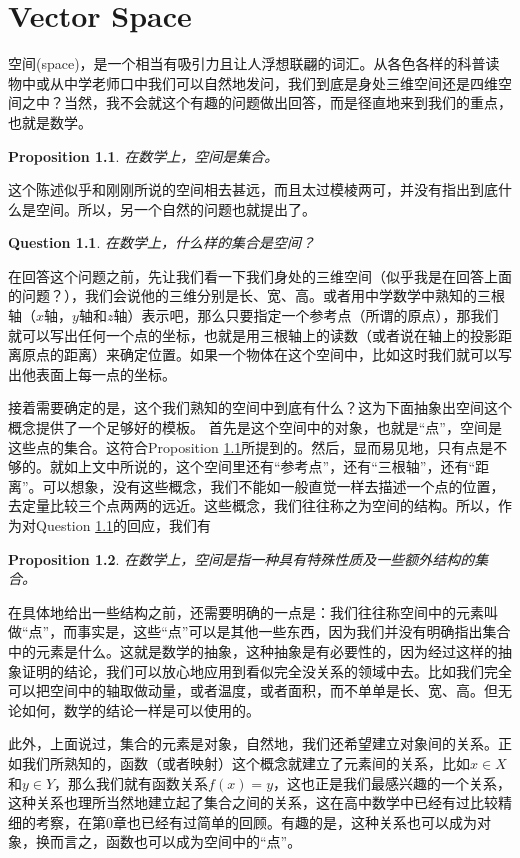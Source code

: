 \documentclass[11pt,a4paper,openany]{book}%
\theoremstyle{plain}%
\newtheorem{pro}{Proposition}[chapter]%
\newtheorem{que}{Question}[chapter]%
\begin{document}
\chapter{Vector Space}
空间(space)，是一个相当有吸引力且让人浮想联翩的词汇。从各色各样的科普读物中或从中学老师口中我们可以自然地发问，我们到底是身处三维空间还是四维空间之中？当然，我不会就这个有趣的问题做出回答，而是径直地来到我们的重点，也就是数学。
\begin{pro}
\label{空间是集合}
在数学上，空间是集合。
\end{pro}
这个陈述似乎和刚刚所说的空间相去甚远，而且太过模棱两可，并没有指出到底什么是空间。所以，另一个自然的问题也就提出了。
\begin{que}
\label{什么是空间}
在数学上，什么样的集合是空间？
\end{que}

\indent 在回答这个问题之前，先让我们看一下我们身处的三维空间（似乎我是在回答上面的问题？），我们会说他的三维分别是长、宽、高。或者用中学数学中熟知的三根轴（$x$轴，$y$轴和$z$轴）表示吧，那么只要指定一个参考点（所谓的原点），那我们就可以写出任何一个点的坐标，也就是用三根轴上的读数（或者说在轴上的投影距离原点的距离）来确定位置。如果一个物体在这个空间中，比如这时我们就可以写出他表面上每一点的坐标。

接着需要确定的是，这个我们熟知的空间中到底有什么？这为下面抽象出空间这个概念提供了一个足够好的模板。
首先是这个空间中的对象，也就是“点”，空间是这些点的集合。这符合Proposition \ref{空间是集合}所提到的。然后，显而易见地，只有点是不够的。就如上文中所说的，这个空间里还有“参考点”，还有“三根轴”，还有“距离”。可以想象，没有这些概念，我们不能如一般直觉一样去描述一个点的位置，去定量比较三个点两两的远近。这些概念，我们往往称之为{\kaishu 空间的结构}。所以，作为对Question \ref{什么是空间}的回应，我们有
\begin{pro}
\label{空间}
在数学上，空间是指一种具有特殊性质及一些额外结构的集合。
\end{pro}

\indent 在具体地给出一些结构之前，还需要明确的一点是：我们往往称空间中的元素叫做“点”，而事实是，这些“点”可以是其他一些东西，因为我们并没有明确指出集合中的元素是什么。这就是数学的抽象，这种抽象是有必要性的，因为经过这样的抽象证明的结论，我们可以放心地应用到看似完全没关系的领域中去。比如我们完全可以把空间中的轴取做动量，或者温度，或者面积，而不单单是长、宽、高。但无论如何，数学的结论一样是可以使用的。

此外，上面说过，集合的元素是对象，自然地，我们还希望建立对象间的关系。正如我们所熟知的，函数（或者映射）这个概念就建立了元素间的关系，比如$x\in X$和$y\in Y$，那么我们就有函数关系$f(x)=y$，这也正是我们最感兴趣的一个关系，这种关系也理所当然地建立起了集合之间的关系，这在高中数学中已经有过比较精细的考察，在第0章也已经有过简单的回顾。有趣的是，这种关系也可以成为对象，换而言之，函数也可以成为空间中的“点”。
\end{document}
